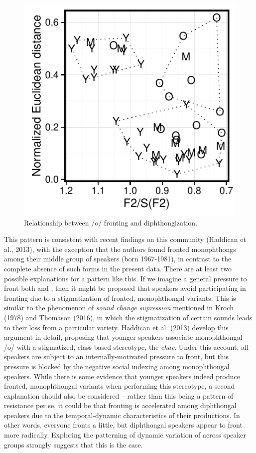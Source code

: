 \documentclass[12pt]{article}
\begin{document}
\begin{figure}
\centering
\includegraphics{ofrontingdip.pdf}
\caption{Relationship between /o/ fronting and diphthongization.}
\end{figure}

This pattern is consistent with recent findings on this community (Haddican et al., 2013), with the exception that the authors found fronted monophthongs among their middle group of speakers (born 1967-1981), in contrast to the complete absence of such forms in the present data. There are at least two possible explanations for a pattern like this. If we imagine a general pressure to front both  and , then it might be proposed that speakers avoid participating in  fronting due to a stigmatization of fronted, monophthongal variants. This is similar to the phenomenon of \textit{sound change supression} mentioned in Kroch (1978) and Thomason (2016), in which the stigmatization of certain sounds leads to their loss from a particular variety. Haddican et al. (2013) develop this argument in detail, proposing that younger speakers associate monophthongal /o/ with a stigmatized, class-based stereotype, the \textit{chav}. Under this account, all speakers are subject to an internally-motivated pressure to front, but this pressure is blocked by the negative social indexing among monophthongal speakers. While there is some evidence that younger speakers indeed produce fronted, monophthongal variants when performing this stereotype, a second explanation should also be considered -- rather than this being a pattern of resistance per se, it could be that fronting is accelerated among diphthongal speakers due to the temporal-dynamic characteristics of their  productions. In other words, everyone fronts  a little, but diphthongal speakers appear to front more radically. Exploring the patterning of dynamic variation of  across speaker groups strongly suggests that this is the case. 
\end{document}

